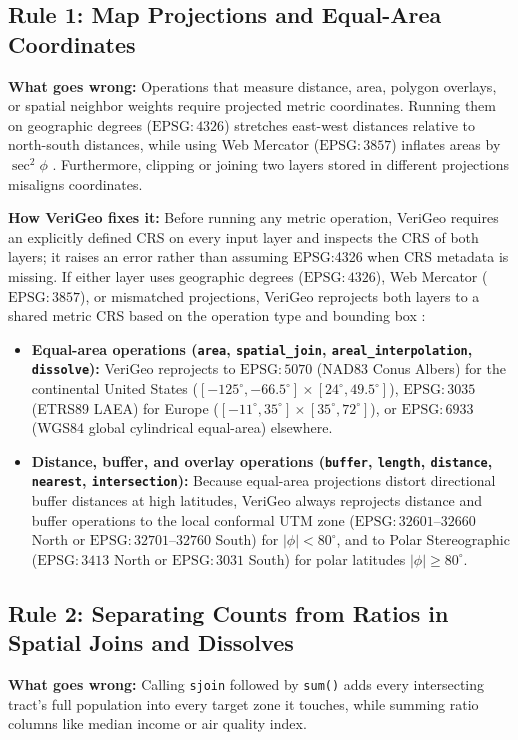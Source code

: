 \documentclass[10pt,twocolumn]{article}
\begin{document}
\subsection{Rule 1: Map Projections and Equal-Area Coordinates}
\textbf{What goes wrong:} Operations that measure distance, area, polygon overlays, or spatial neighbor weights require projected metric coordinates. Running them on geographic degrees ($\text{EPSG}:4326$) stretches east-west distances relative to north-south distances, while using Web Mercator ($\text{EPSG}:3857$) inflates areas by $\sec^2\phi$ \cite{battersby2014implications}. Furthermore, clipping or joining two layers stored in different projections misaligns coordinates.

\textbf{How VeriGeo fixes it:} Before running any metric operation, VeriGeo requires an explicitly defined CRS on every input layer and inspects the CRS of both layers; it raises an error rather than assuming EPSG:4326 when CRS metadata is missing. If either layer uses geographic degrees ($\text{EPSG}:4326$), Web Mercator ($\text{EPSG}:3857$), or mismatched projections, VeriGeo reprojects both layers to a shared metric CRS based on the operation type and bounding box \cite{savric2016projection}:
\begin{itemize}
  \item \textbf{Equal-area operations (\texttt{area}, \texttt{spatial\_join}, \texttt{areal\_interpolation}, \texttt{dissolve}):} VeriGeo reprojects to $\text{EPSG}:5070$ (NAD83 Conus Albers) for the continental United States ($[-125^\circ, -66.5^\circ] \times [24^\circ, 49.5^\circ]$), $\text{EPSG}:3035$ (ETRS89 LAEA) for Europe ($[-11^\circ, 35^\circ] \times [35^\circ, 72^\circ]$), or $\text{EPSG}:6933$ (WGS84 global cylindrical equal-area) elsewhere.
  \item \textbf{Distance, buffer, and overlay operations (\texttt{buffer}, \texttt{length}, \texttt{distance}, \texttt{nearest}, \texttt{intersection}):} Because equal-area projections distort directional buffer distances at high latitudes, VeriGeo always reprojects distance and buffer operations to the local conformal UTM zone ($\text{EPSG}:32601\text{--}32660$ North or $\text{EPSG}:32701\text{--}32760$ South) for $|\phi| < 80^\circ$, and to Polar Stereographic ($\text{EPSG}:3413$ North or $\text{EPSG}:3031$ South) for polar latitudes $|\phi| \ge 80^\circ$.
\end{itemize}

\subsection{Rule 2: Separating Counts from Ratios in Spatial Joins and Dissolves}
\textbf{What goes wrong:} Calling \texttt{sjoin} followed by \texttt{sum()} adds every intersecting tract's full population into every target zone it touches, while summing ratio columns like median income or air quality index.
\end{document}
